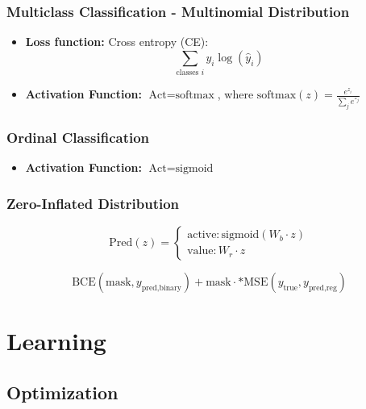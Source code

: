 \subsubsection{Multiclass Classification - Multinomial Distribution}
\begin{notes}
    \begin{itemize}
        \item \textbf{Loss function:} Cross entropy (CE):
        \[
        \sum_{\text{classes } i} y_i \log(\hat{y}_i)
        \]
        \item \textbf{Activation Function:} $\text{Act} = \text{softmax}$, where $\text{softmax}(z) = \frac{e^{z_i}}{\sum_j e^{z_j}}$
    \end{itemize}
\end{notes}

\subsubsection{Ordinal Classification}
\begin{notes}
    \begin{itemize}
        \item \textbf{Activation Function:} $\text{Act} = \text{sigmoid}$
    \end{itemize}
\end{notes}

\subsubsection{Zero-Inflated Distribution}
\begin{example}
    \[
    \text{Pred}(z) =
    \begin{cases}
        \text{active}: \text{sigmoid}(W_b \cdot z) \\
        \text{value}: W_r \cdot z
    \end{cases}
    \]

    \[
    \text{BCE}(\text{mask}, y_{\text{pred,binary}}) + \text{mask} \cdot * \text{MSE}(y_{\text{true}}, y_{\text{pred,reg}})
    \]
\end{example}



\section{Learning}
\subsection{Optimization}
